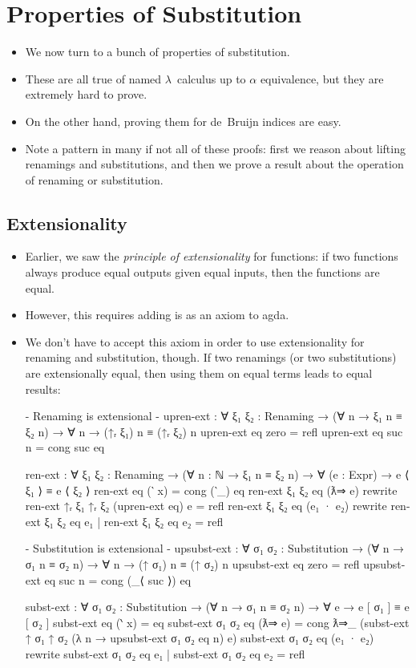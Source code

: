 \documentclass{lecturenotes}
\begin{document}
\newpage
\section{Properties of Substitution}
\label{sec:prop-subst}

\begin{itemize}
\item We now turn to a bunch of properties of substitution.
\item These are all true of named $\lambda$~calculus up to $\alpha$ equivalence, but they are extremely hard to prove.
\item On the other hand, proving them for de~Bruijn indices are easy.
\item Note a pattern in many if not all of these proofs: first we reason about lifting renamings and substitutions, and then we prove a result about the operation of renaming or substitution.
\end{itemize}

\subsection{Extensionality}
\label{sec:extensionality}

\begin{itemize}
\item Earlier, we saw the \emph{principle of extensionality} for functions: if two functions always produce equal outputs given equal inputs, then the functions are equal.
\item However, this requires adding is as an axiom to agda.
\item We don't have to accept this axiom in order to use extensionality for renaming and substitution, though.
  If two renamings (or two substitutions) are extensionally equal, then using them on equal terms leads to equal results:
\begin{code}
{- Renaming is extensional -}
upren-ext : ∀ {ξ₁ ξ₂ : Renaming} → (∀ {n} → ξ₁ n ≡ ξ₂ n) → ∀ {n} → (↑ᵣ ξ₁) n ≡ (↑ᵣ ξ₂) n
upren-ext eq {zero} = refl
upren-ext eq {suc n} = cong suc eq

ren-ext : ∀ {ξ₁ ξ₂ : Renaming} → (∀ {n : ℕ} → ξ₁ n ≡ ξ₂ n) → ∀ (e : Expr) → e ⟨ ξ₁ ⟩ ≡ e ⟨ ξ₂ ⟩
ren-ext eq (‵ x) = cong (‵_) eq
ren-ext {ξ₁} {ξ₂} eq (ƛ⇒ e) rewrite ren-ext  {↑ᵣ ξ₁} {↑ᵣ ξ₂} (upren-ext eq) e = refl
ren-ext {ξ₁} {ξ₂} eq (e₁ · e₂) rewrite ren-ext {ξ₁} {ξ₂} eq e₁ | ren-ext {ξ₁} {ξ₂} eq e₂ = refl

{- Substitution is extensional -}
upsubst-ext : ∀ {σ₁ σ₂ : Substitution} → (∀ {n} → σ₁ n ≡ σ₂ n) → ∀ {n} → (↑ σ₁) n ≡ (↑ σ₂) n
upsubst-ext eq {zero} = refl
upsubst-ext eq {suc n} = cong (_⟨ suc ⟩) eq

subst-ext : ∀ {σ₁ σ₂ : Substitution} → (∀ {n} → σ₁ n ≡ σ₂ n) → ∀ e → e [ σ₁ ] ≡ e [ σ₂ ]
subst-ext eq (‵ x) = eq
subst-ext {σ₁} {σ₂} eq (ƛ⇒ e) =
  cong ƛ⇒_ (subst-ext {↑ σ₁} {↑ σ₂} (λ {n} → upsubst-ext {σ₁} {σ₂} eq {n}) e)
subst-ext {σ₁} {σ₂} eq (e₁ · e₂)
    rewrite subst-ext {σ₁} {σ₂} eq e₁ | subst-ext {σ₁} {σ₂} eq e₂ = refl
\end{code}
\end{itemize}
\end{document}
